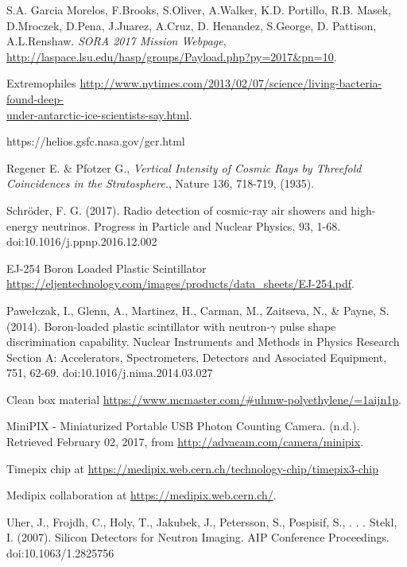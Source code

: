 \newpage

\begin{thebibliography}{9}
S.A. Garcia Morelos, F.Brooks, S.Oliver, A.Walker, K.D. Portillo, R.B. Masek, D.Mroczek, D.Pena, J.Juarez, A.Cruz, D. Henandez, S.George, D. Pattison, A.L.Renshaw. \textit{SORA 2017 Mission Webpage}, \url{http://laspace.lsu.edu/hasp/groups/Payload.php?py=2017&pn=10}.

  Extremophiles \href{http://www.nytimes.com/2013/02/07/science/living-bacteria-found-deep-under-antarctic-ice-scientists-say.html}{http://www.nytimes.com/2013/02/07/science/living-bacteria-found-deep-\\under-antarctic-ice-scientists-say.html}.

  https://helios.gsfc.nasa.gov/gcr.html

  Regener E. \& Pfotzer G., \textit{Vertical Intensity of Cosmic Rays by Threefold Coincidences in the Stratosphere.}, Nature 136, 718-719, (1935). 

  Schröder, F. G. (2017). Radio detection of cosmic-ray air showers and high-energy neutrinos. Progress in Particle and Nuclear Physics, 93, 1-68. doi:10.1016/j.ppnp.2016.12.002
    
  EJ-254 Boron Loaded Plastic Scintillator \url{https://eljentechnology.com/images/products/data_sheets/EJ-254.pdf}.

  Pawełczak, I., Glenn, A., Martinez, H., Carman, M., Zaitseva, N., \& Payne, S. (2014). Boron-loaded plastic scintillator with neutron-$\gamma$ pulse shape discrimination capability. Nuclear Instruments and Methods in Physics Research Section A: Accelerators, Spectrometers, Detectors and Associated Equipment, 751, 62-69. doi:10.1016/j.nima.2014.03.027

  Clean box material \url{https://www.mcmaster.com/\#uhmw-polyethylene/=1aijn1p}.

  MiniPIX - Miniaturized Portable USB Photon Counting Camera. (n.d.). Retrieved February 02, 2017, from \url{http://advacam.com/camera/minipix}.

  Timepix chip at \url{https://medipix.web.cern.ch/technology-chip/timepix3-chip}

  Medipix collaboration at \url{https://medipix.web.cern.ch/}.

  Uher, J., Frojdh, C., Holy, T., Jakubek, J., Petersson, S., Pospisif, S., . . . Stekl, I. (2007). Silicon Detectors for Neutron Imaging. AIP Conference Proceedings. doi:10.1063/1.2825756
  

\end{thebibliography}
